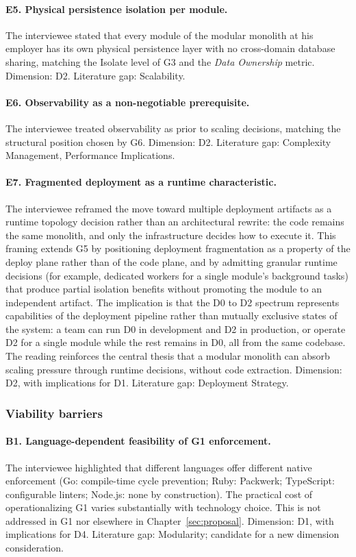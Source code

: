 \paragraph*{E5. Physical persistence isolation per module.} The interviewee stated that every module of the modular monolith at his employer has its own physical persistence layer with no cross-domain database sharing, matching the Isolate level of G3 and the \emph{Data Ownership} metric. Dimension: D2. Literature gap: Scalability.

\paragraph*{E6. Observability as a non-negotiable prerequisite.} The interviewee treated observability as prior to scaling decisions, matching the structural position chosen by G6. Dimension: D2. Literature gap: Complexity Management, Performance Implications.

\paragraph*{E7. Fragmented deployment as a runtime characteristic.} The interviewee reframed the move toward multiple deployment artifacts as a runtime topology decision rather than an architectural rewrite: the code remains the same monolith, and only the infrastructure decides how to execute it. This framing extends G5 by positioning deployment fragmentation as a property of the deploy plane rather than of the code plane, and by admitting granular runtime decisions (for example, dedicated workers for a single module's background tasks) that produce partial isolation benefits without promoting the module to an independent artifact. The implication is that the D0 to D2 spectrum represents capabilities of the deployment pipeline rather than mutually exclusive states of the system: a team can run D0 in development and D2 in production, or operate D2 for a single module while the rest remains in D0, all from the same codebase. The reading reinforces the central thesis that a modular monolith can absorb scaling pressure through runtime decisions, without code extraction. Dimension: D2, with implications for D1. Literature gap: Deployment Strategy.

\subsubsection*{Viability barriers}

\paragraph*{B1. Language-dependent feasibility of G1 enforcement.} The interviewee highlighted that different languages offer different native enforcement (Go: compile-time cycle prevention; Ruby: Packwerk; TypeScript: configurable linters; Node.js: none by construction). The practical cost of operationalizing G1 varies substantially with technology choice. This is not addressed in G1 nor elsewhere in Chapter~\ref{sec:proposal}. Dimension: D1, with implications for D4. Literature gap: Modularity; candidate for a new dimension consideration.

